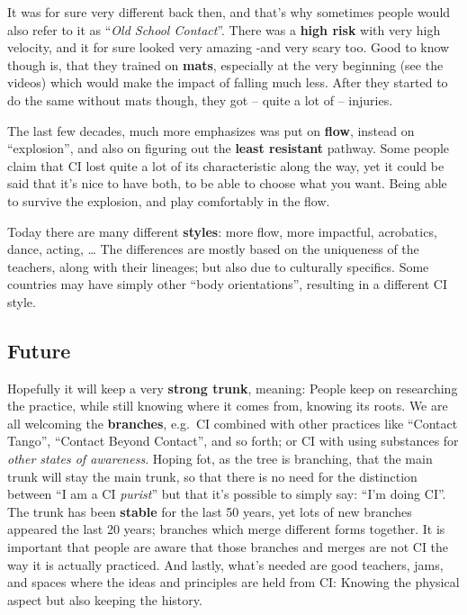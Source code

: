 It was for sure very different back then, and that's why sometimes people would also refer to it as ``\textit{Old School Contact}''.
There was a \textbf{high risk} with very high velocity, and it for sure looked very amazing -and very scary too.
Good to know though is, that they trained on \textbf{mats}, especially at the very beginning (see the videos) which would make the impact of falling much less.
After they started to do the same without mats though, they got -- quite a lot of -- injuries.

The last few decades, much more emphasizes was put on \textbf{flow}, instead on ``explosion'', and also on figuring out the \textbf{least resistant} pathway.
Some people claim that CI lost quite a lot of its characteristic along the way, yet it could be said that it's nice to have both, to be able to choose what you want.
Being able to survive the explosion, and play comfortably in the flow.

Today there are many different \textbf{styles}: more flow, more impactful, acrobatics, dance, acting, \ldots
The differences are mostly based on the uniqueness of the teachers, along with their lineages; but also due to culturally specifics.
Some countries may have simply other ``body orientations'', resulting in a different CI style.

\subsection{Future}\label{subsec:future}

Hopefully it will keep a very \textbf{strong trunk}, meaning: People keep on researching the practice, while still knowing where it comes from, knowing its roots.
We are all welcoming the \textbf{branches}, e.g.\ CI combined with other practices like ``Contact Tango'', ``Contact Beyond Contact'', and so forth; or CI with using substances for \textit{other states of awareness}.
Hoping fot, as the tree is branching, that the main trunk will stay the main trunk, so that there is no need for the distinction between ``I am a CI \textit{purist}'' but that it's possible to simply say: ``I'm doing CI''.
The trunk has been \textbf{stable} for the last 50 years, yet lots of new branches appeared the last 20 years; branches which merge different forms together.
It is important that people are aware that those branches and merges are not CI the way it is actually practiced.
And lastly, what's needed are good teachers, jams, and spaces where the ideas and principles are held from CI: Knowing the physical aspect but also keeping the history.
